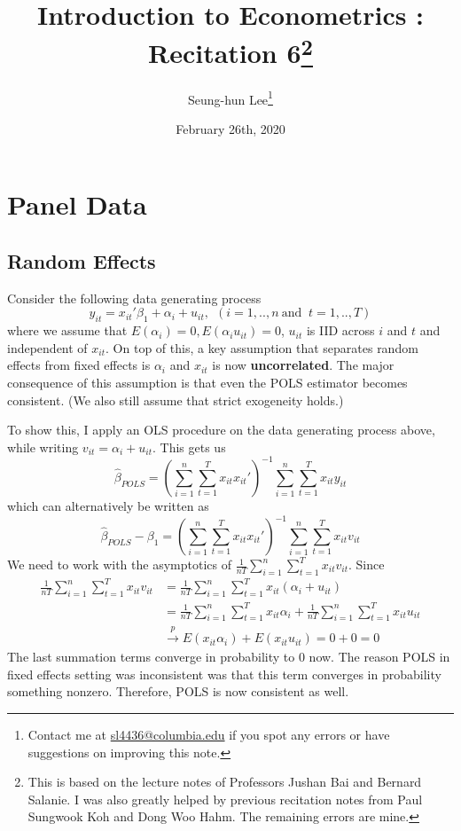 \documentclass[12pt]{article}
\title{Introduction to Econometrics \ROM{2}: Recitation 6\footnote{This is based on the lecture notes of Professors Jushan Bai and Bernard Salanie. I was also greatly helped by previous recitation notes from Paul Sungwook Koh and Dong Woo Hahm. The remaining errors are mine. }}
\theoremstyle{definition}
\theoremstyle{property}
\theoremstyle{assumption}
\theoremstyle{example}
\theoremstyle{comment}
\begin{document}
\linespread{1.25}
\onehalfspacing

\author{Seung-hun Lee\footnote{Contact me at \href{mailto:sl4436@columbia.edu}{sl4436@columbia.edu} if you spot any errors or have suggestions on improving this note.}}
\date{February 26th, 2020}
\maketitle
\thispagestyle{firstpage}

\section{Panel Data}
\subsection{Random Effects}
Consider the following data generating process
\[
y_{it}=x_{it}'\beta_1 + \alpha_i +u_{it}, \ \ (i=1,..,n \ \text{and } \ t=1,..,T)
\]
where we assume that $E(\alpha_i)=0, E(\alpha_i u_{it})=0$, $u_{it}$ is IID across $i$ and $t$ and independent of $x_{it}$. On top of this, a key assumption that separates random effects from fixed effects is $\alpha_i$ and $x_{it}$ is now \textbf{uncorrelated}. The major consequence of this assumption is that even the POLS estimator becomes consistent. (We also still assume that strict exogeneity holds.) \par
To show this, I apply an OLS procedure on the data generating process above, while writing $v_{it}=\alpha_i + u_{it}$. This gets us
\[
\hat{\beta}_{POLS}=\left( \sum_{i=1}^n\sum_{t=1}^T x_{it} x_{it}'\right)^{-1}\sum_{i=1}^n\sum_{t=1}^T x_{it} y_{it}
\]
which can alternatively be written as
\[
\hat{\beta}_{POLS}-\beta_1 =\left( \sum_{i=1}^n\sum_{t=1}^T x_{it} x_{it}'\right)^{-1}\sum_{i=1}^n\sum_{t=1}^T x_{it} v_{it}
\]
We need to work with the asymptotics of $\frac{1}{nT}\sum_{i=1}^n\sum_{t=1}^T x_{it} v_{it}$. Since
\begin{align*}
\frac{1}{nT}\sum_{i=1}^n\sum_{t=1}^T x_{it} v_{it}&=\frac{1}{nT}\sum_{i=1}^n\sum_{t=1}^T x_{it} (\alpha_i+ u_{it})\\
&=\frac{1}{nT}\sum_{i=1}^n\sum_{t=1}^T x_{it}\alpha_i+ \frac{1}{nT}\sum_{i=1}^n\sum_{t=1}^T x_{it}u_{it}\\
&\xrightarrow{p} E(x_{it}\alpha_i)+E(x_{it}u_{it})=0+0=0
\end{align*}
The last summation terms converge in probability to 0 now. The reason POLS in fixed effects setting was inconsistent was that this term converges in probability something nonzero. Therefore, POLS is now consistent as well. \par
\end{document}
